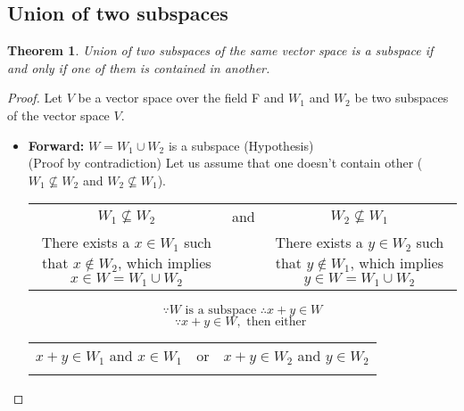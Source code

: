 \documentclass[a4paper, titlepage]{article}
\newtheorem{theorem}{Theorem}[section]
\begin{document}
\subsection{Union of two subspaces}
    \begin{theorem}
        Union of two subspaces of the same vector space is a 
        subspace if and only if one of them is contained in another.
    \end{theorem}
    \begin{proof}
        Let $V$ be a vector space over the field F and $W_1$ and $W_2$ 
        be two subspaces of the vector space $V$.
        \begin{itemize}
            \item \textbf{Forward: } $W = W_1 \cup W_2$ is a 
            subspace (Hypothesis) \hfill \\
            (Proof by contradiction) Let us assume that one doesn't 
            contain other ($W_1 \not\subseteq W_2$ and 
            $W_2 \not\subseteq W_1$). \\
            \begin{tabularx}{\linewidth}{c c c}
                $W_1 \not\subseteq W_2$
                &
                and
                &
                $W_2 \not\subseteq W_1$ \\
                \begin{minipage}[c]{0.45\linewidth}
                    There exists a $x \in W_1$ such that $x \notin W_2$,
                    which implies $x \in W = W_1 \cup W_2$
                \end{minipage}
                &
                &
                \begin{minipage}[c]{0.45\linewidth}
                    There exists a $y \in W_2$ such that $y \notin W_1$,
                    which implies $y \in W = W_1 \cup W_2$
                \end{minipage}
            \end{tabularx}
            \[
                \because W \text{ is a subspace } \therefore x + y
                \in W
            \]
            \[
                \because x + y \in W, \text{ then either }
            \]
            \begin{tabularx}{\linewidth}{c c c}
                $x + y \in W_1$ and $x \in W_1$
                &
                or
                &
                $x + y \in W_2$ and $y \in W_2$ \\
                \begin{minipage}[c]{0.45\linewidth}

\end{minipage}
\end{tabularx}
\end{itemize}
\end{proof}
\end{document}

